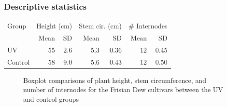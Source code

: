 \documentclass[
    12pt,
    aspectratio=1610,
    b,
    bibliography=../bibliography.bib,
    link-citations]{beamer}
\begin{document}
    \begin{frame}
        \frametitle{Descriptive statistics}
        \footnotesize
        \begin{tabular}{lrrrrrr}
            Group & \multicolumn{2}{l}{Height (\unit[mode=text]{\cm})} & \multicolumn{2}{l}{Stem cir. (\unit[mode=text]{\cm})} & \multicolumn{2}{l}{\# Internodes} \\
            & Mean & SD & Mean & SD & Mean & SD \\
            \midrule
            UV & \num[mode=text]{55} & \num[mode=text]{2.6} & \num[mode=text]{5.3} & \num[mode=text]{0.36} & \num[mode=text]{12} & \num[mode=text]{0.45} \\
            Control & \num[mode=text]{58} & \num[mode=text]{9.0} & \num[mode=text]{5.6} & \num[mode=text]{0.43} & \num[mode=text]{12} & \num[mode=text]{0.50} \\
        \end{tabular}
        \vfill
        \begin{figure}
            \begin{subfigure}[t]{.32\textwidth}
                
            \end{subfigure}
            \begin{subfigure}[t]{.32\textwidth}
                
            \end{subfigure}
            \begin{subfigure}[t]{.32\textwidth}
                
            \end{subfigure}
            \caption{Boxplot comparisons of plant height, stem circumference, and number of internodes for the Frisian Dew cultivars between the UV and control groups}
        \end{figure}
    \end{frame}
\end{document}
